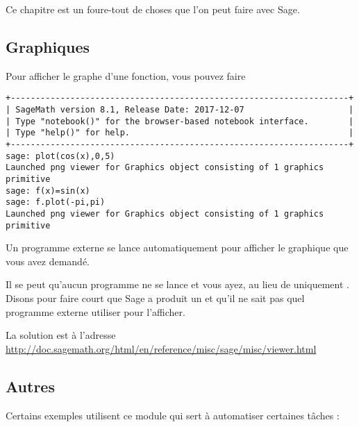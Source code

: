 
Ce chapitre est un foure-tout de choses que l'on peut faire avec Sage.

\subsection{Graphiques}

Pour afficher le graphe d'une fonction, vous pouvez faire
\begin{verbatim}
+--------------------------------------------------------------------+
| SageMath version 8.1, Release Date: 2017-12-07                     | 
| Type "notebook()" for the browser-based notebook interface.        | 
| Type "help()" for help.                                            |
+--------------------------------------------------------------------+
sage: plot(cos(x),0,5)
Launched png viewer for Graphics object consisting of 1 graphics primitive
sage: f(x)=sin(x)
sage: f.plot(-pi,pi)
Launched png viewer for Graphics object consisting of 1 graphics primitive
\end{verbatim}
Un programme externe se lance automatiquement pour afficher le graphique que vous avez demandé.

Il se peut qu'aucun programme ne se lance et vous ayez, au lieu de  uniquement . Disons pour faire court que Sage a produit un  et qu'il ne sait pas quel programme externe utiliser pour l'afficher.

La solution est à l'adresse \url{http://doc.sagemath.org/html/en/reference/misc/sage/misc/viewer.html}
\subsection{Autres}

Certains exemples utilisent ce module qui sert à automatiser certaines tâches : 



